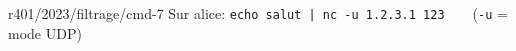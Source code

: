 \begin{question}{r401/2023/filtrage/cmd-7}
  Sur alice: {\tt echo salut | nc -u 1.2.3.1 123}~~~~(\texttt{-u} = mode UDP)
  \begin{reponseshoriz}
  \end{reponseshoriz}
\end{question}
